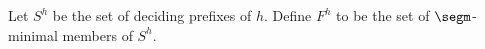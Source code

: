 \begin{definition}
Let $S^h$ be the set of deciding prefixes of $h$.  Define $F^h$ to be the
set of $\segm$-minimal members of $S^h$.
\end{definition}
